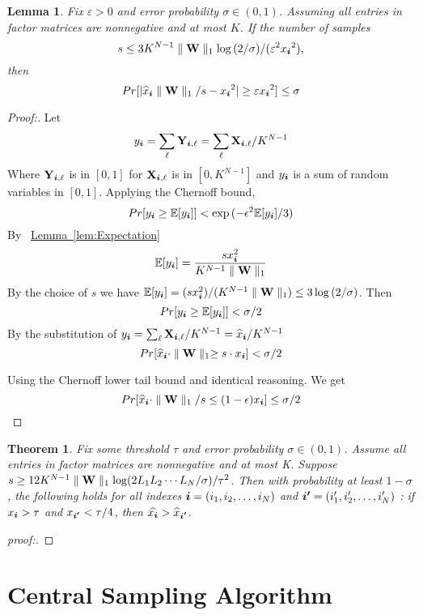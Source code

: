 \documentclass[letterpaper]{article}
\newcommand{\V}[1]{{\bm{{\MakeLowercase{#1}}}}}
\newcommand{\M}[1]{{\bm{\mathbf{\MakeUppercase{#1}}}}}
\newcommand{\norm}[2]{\parallel#1\parallel_{#2}}
\newcommand{\Lem}[1] {\hyperref[lem:#1] {Lemma~\ref*{lem:#1}}} %
\newtheorem{lemma}{Lemma}
\newtheorem{theorem}{Theorem}
\begin{document}
\begin{lemma}\label{lem:Bound}
Fix $\varepsilon > 0$ and error probability $\sigma \in (0,1)$. Assuming all entries in factor matrices are nonnegative and at most $K$. If the number of samples
\[
s \leq 3K^{N-1}\norm{\M{W}}{1}\log{(2/\sigma)}/(\varepsilon ^2{x_{\V{i}}}^2),
\]
then
\[
Pr[|{\widehat{x}_{\V{i}}}\norm{\M{W}}{1}/s-{x_{\V{i}}}^2| \geq \varepsilon{x_{\V{i}}}^2] \leq \sigma
\]
\end{lemma}

\begin{proof}[Proof:]
Let
\[
    y_{\V{i}} = \sum_{\ell}\M{Y}_{\V{i},\ell} = \sum_{\ell}\M{X}_{\V{i},\ell}/K^{N-1}
\]
Where $\M{Y}_{\V{i},\ell}$ is in $[0,1]$ for $\M{X}_{\V{i},\ell}$ is in $[0,K^{N-1}]$ and $y_{\V{i}}$ is a sum of random variables in $[0,1]$.
Applying the Chernoff bound,
\[
Pr[y_{\V{i}} \geq \mathbb{E}[y_{\V{i}}]] < \exp{(-\epsilon^2\mathbb{E}[y_{\V{i}}]/3)}
\]
By ~\Lem{Expectation}
\[
\mathbb{E}[y_{\V{i}}] = \frac{sx^2_{\V{i}}}{K^{N-1}\norm{\M{W}}{1}}
\]
By the choice of $s$ we have $\mathbb{E}[y_{\V{i}}]=(sx^2_{\V{i}})/(K^{N-1}\norm{\M{W}}{1}) \leq 3\log{(2/\sigma)}$. Then
\[
Pr[y_{\V{i}} \geq \mathbb{E}[y_{\V{i}}]] < \sigma/2
\]
By the substitution of $y_{\V{i}}=\sum_{\ell}\M{X}_{\V{i},\ell}/K^{N-1}=\widehat{x}_{\V{i}}/K^{N-1}$
\[
Pr[\widehat{x}_{\V{i}}\cdot\norm{\M{W}}{1} \geq s\cdot x_{\V{i}}] < \sigma/2
\]

Using the Chernoff lower tail bound and identical reasoning. We get
\[
Pr[\widehat{x}_{\V{i}}\cdot\norm{\M{W}}{1}/s \leq (1-\epsilon)x_{\V{i}}] \leq \sigma/2
\]
\end{proof}

\begin{theorem}\label{theo:Order}
Fix some threshold $\tau$ and error probability $\sigma\in(0,1)$. Assume all entries in factor matrices are nonnegative and at most  K. Suppose $s \geq 12K^{N-1}\norm{\M{W}}{1}\log(2L_1L_2\cdots L_N/\sigma)/{\tau^2}$. Then with probability at least $1-\sigma$, the following holds for all indexes $\V{i} = (i_1,i_2,\ldots,i_N)$ and $\V{i'} = (i'_1,i'_2,\ldots,i'_N)$ : if $x_{\V{i}}>\tau$ and $ x_{\V{i'}} < \tau/4$, then $\widehat{x_{\V{i}}}>\widehat{x}_{\V{i'}}$.
\end{theorem}

\begin{proof}[proof:]

\end{proof}


\section{Central Sampling Algorithm}
\end{document}
